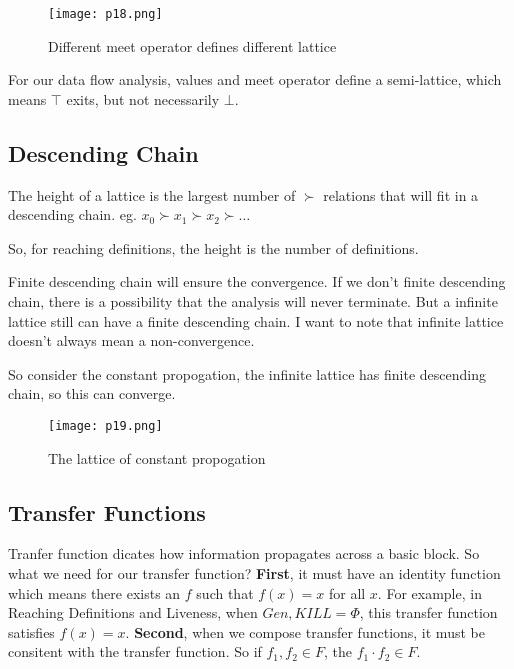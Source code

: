 \begin{figure}[h]
    \centering
    \texttt{[image: p18.png]}
    \caption{Different meet operator defines different lattice}
    \label{fig:p15}
\end{figure}




For our data flow analysis, values and meet operator define a semi-lattice, which means \(\top\) exits, but not necessarily \(	\bot\).





\subsection{Descending Chain}

The height of a lattice is the largest number of \(\succ \) relations that will fit in a descending chain. eg. \(x_0 \succ x_1 \succ x_2 \succ \dots\)

So, for reaching definitions, the height is the number of definitions.

Finite descending chain will ensure the convergence. If we don't finite descending chain, there is a possibility that
the analysis will never terminate. But a infinite lattice still can have a finite descending chain. I want to note that 
infinite lattice doesn't always mean a non-convergence.

So consider the constant propogation, the infinite lattice has finite descending chain, so this can converge.

\begin{figure}[h]
    \centering
    \texttt{[image: p19.png]}
    \caption{The lattice of constant propogation}
    \label{fig:p19}
\end{figure}


\subsection{Transfer Functions}

Tranfer function dicates how information propagates across a basic block. 
So what we need for our transfer function? \textbf{First}, it must have an identity function which means 
there exists an \(f\) such that \(f(x) = x \) for all \(x\). For example, in Reaching Definitions and Liveness, when 
\(Gen, KILL = \Phi \), this transfer function satisfies \(f(x) = x \). \textbf{Second}, when we compose transfer functions, 
it must be consitent with the transfer function. So if \(f_1,f_2 \in F\), the  \(f_1	\cdot f_2 \in F\).


